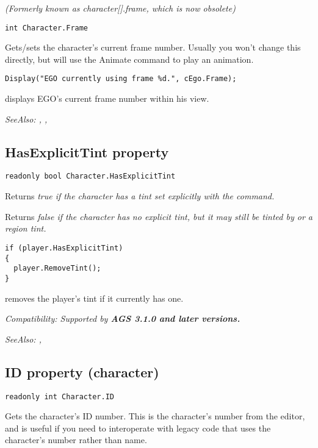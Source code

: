 \it{(Formerly known as character[].frame, which is now obsolete)}

\begin{verbatim}
int Character.Frame
\end{verbatim}
Gets/sets the character's current frame number. Usually you won't change this
directly, but will use the Animate command to play an animation.

\begin{verbatim}
Display("EGO currently using frame %d.", cEgo.Frame);
\end{verbatim}
displays EGO's current frame number within his view.

\it{SeeAlso:} ,
,


\subsection{HasExplicitTint property}\label{Character.HasExplicitTint}%

\begin{verbatim}
readonly bool Character.HasExplicitTint
\end{verbatim}
Returns \it{true} if the character has a tint set explicitly with the
 command.

Returns \it{false} if the character has no explicit tint, but it may still be
tinted by  or a region tint.

\begin{verbatim}
if (player.HasExplicitTint)
{
  player.RemoveTint();
}
\end{verbatim}
removes the player's tint if it currently has one.

\it{Compatibility:} Supported by \bf{AGS 3.1.0} and later versions.

\it{SeeAlso:} ,


\subsection{ID property (character)}\label{Character.ID}%

\begin{verbatim}
readonly int Character.ID
\end{verbatim}
Gets the character's ID number. This is the character's number from the editor, and is
useful if you need to interoperate with legacy code that uses the character's number
rather than name.

